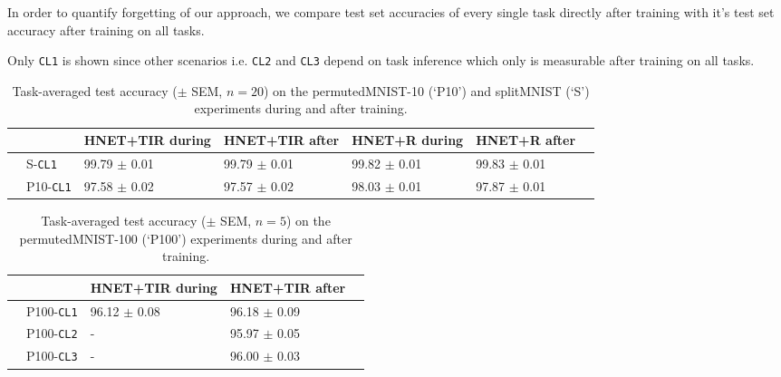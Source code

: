 \documentclass{article}
\begin{document}
In order to quantify forgetting of our approach, we compare test set accuracies of every single task directly after training with it's test set accuracy after training on all tasks.

Only \texttt{CL1} is shown since other scenarios i.e. \texttt{CL2} and \texttt{CL3} depend on task inference which only is measurable after training on all tasks.

\begin{table*}[ht!]
 \centering
  \caption{Task-averaged test accuracy ($\pm$ SEM, $n=20$) on the permutedMNIST-10 (`P10') and splitMNIST (`S') experiments during and after training.}
  \begin{small}
  \begin{tabular}{llp{1.65cm}p{1.65cm}p{1.62cm}p{1.62cm}p{1.62cm}} \toprule
     & & \textbf{HNET+TIR during} & \textbf{HNET+TIR after} & \textbf{HNET+R during} & \textbf{HNET+R after} \\ \midrule \midrule
     \multirow{3}{*}{}
    & S-\texttt{CL1} & 99.79 $\pm$  0.01 & 99.79 $\pm$  0.01 & 99.82 $\pm$  0.01 & 99.83 $\pm$  0.01 \\
    \midrule
    \multirow{3}{*}{}
    & P10-\texttt{CL1} & 97.58 $\pm$  0.02 &  97.57 $\pm$  0.02 & 98.03 $\pm$  0.01 & 97.87 $\pm$  0.01  \\
    \bottomrule
  \end{tabular}
  \label{tab:mnist-split-acc-quantification}
  \end{small}
\end{table*}

\begin{table*}[ht!]
 \centering
  \caption{Task-averaged test accuracy ($\pm$ SEM, $n=5$) on the  permutedMNIST-100 (`P100') experiments during and after training.}
  \begin{small}
  \begin{tabular}{llp{1.62cm}p{1.62cm}p{1.62cm}} \toprule
     & & \textbf{HNET+TIR during} & \textbf{HNET+TIR after} \\ \midrule \midrule
    \multirow{3}{*}{}
    & P100-\texttt{CL1} & 96.12 $\pm$  0.08 & 96.18 $\pm$  0.09  \\
    &  P100-\texttt{CL2} & \qquad - & 95.97 $\pm$  0.05 \\
    & P100-\texttt{CL3} &  \qquad - & 96.00 $\pm$  0.03 \\
    \bottomrule
  \end{tabular}
  \label{tab:mnist-perm-acc-quantification}
  \end{small}
\end{table*}
\end{document}
